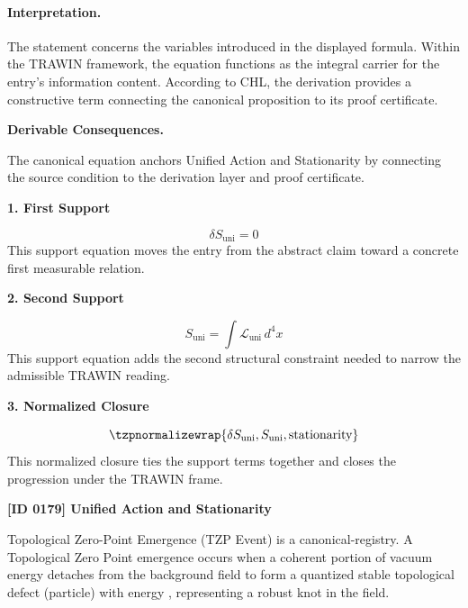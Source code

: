 \paragraph{Interpretation.}
The statement concerns the variables introduced in the displayed formula. Within the TRAWIN framework, the equation functions as the integral carrier for the entry’s information content. According to CHL, the derivation provides a constructive term connecting the canonical proposition to its proof certificate.

\par\vspace{0.35em}
\noindent\textbf{Derivable Consequences.}\quad
\begingroup
\footnotesize
\raggedright
The canonical equation anchors Unified Action and Stationarity by connecting the source condition to the derivation layer and proof certificate.
\par\endgroup

\noindent\textbf{1. First Support}\par
\[
\delta S_{\mathrm{uni}} = 0
\]
\noindent This support equation moves the entry from the abstract claim toward a concrete first measurable relation.\par
\noindent\textbf{2. Second Support}\par
\[
S_{\mathrm{uni}} = \int \mathcal{L}_{\mathrm{uni}}\, d^4x
\]
\noindent This support equation adds the second structural constraint needed to narrow the admissible TRAWIN reading.\par
\noindent\textbf{3. Normalized Closure}\par
\[
\tzpnormalizewrap{\delta S_{\mathrm{uni}},S_{\mathrm{uni}},\text{stationarity}}
\]
\noindent This normalized closure ties the support terms together and closes the progression under the TRAWIN frame.\par

\clearpage
\noindent\textbf{[ID 0179] Unified Action and Stationarity}\par
\vspace{0.35em}
\begingroup\small
{}
Topological Zero-Point Emergence (TZP Event) is a canonical-registry. A Topological Zero Point emergence occurs when a coherent portion of vacuum energy detaches from the background field to form a quantized stable topological defect (particle) with energy , representing a robust knot in the field.  

